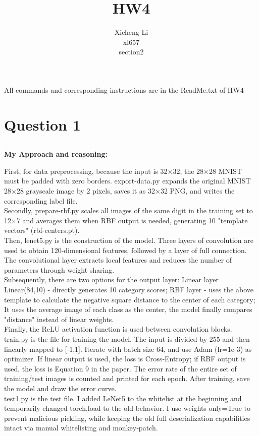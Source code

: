 \documentclass{article}
\title{HW4}
\author{Xicheng Li\\xl657\\section2}
\begin{document}
\maketitle

All commands and corresponding instructions are in the ReadMe.txt of HW4

\section{Question 1}

\subsection{}

\textbf{My Approach and reasoning:}

First, for data preprocessing, because the input is 32×32, the 28×28 MNIST must be padded with zero borders. export-data.py expands the original MNIST 28×28 grayscale image by 2 pixels, saves it as 32×32 PNG, and writes the corresponding label file.
\\
Secondly, prepare-rbf.py scales all images of the same digit in the training set to 12×7 and averages them when RBF output is needed, generating 10 "template vectors" (rbf-centers.pt).
\\
Then, lenet5.py is the construction of the model. Three layers of convolution are used to obtain 120-dimensional features, followed by a layer of full connection. The convolutional layer extracts local features and reduces the number of parameters through weight sharing.
\\
Subsequently, there are two options for the output layer:
Linear layer Linear(84,10) - directly generates 10 category scores;
RBF layer - uses the above template to calculate the negative square distance to the center of each category; It uses the average image of each class as the center, the model finally compares "distance" instead of linear weights.
\\
Finally, the ReLU activation function is used between convolution blocks.
\\
train.py is the file for training the model. The input is divided by 255 and then linearly mapped to [-1,1]. Iterate with batch size 64, and use Adam (lr=1e-3) as optimizer.
If linear output is used, the loss is Cross‑Entropy; if RBF output is used, the loss is Equation 9 in the paper. The error rate of the entire set of training/test images is counted and printed for each epoch. After training, save the model and draw the error curve.
\\
test1.py is the test file. I added LeNet5 to the whitelist at the beginning and temporarily changed torch.load to the old behavior. I use weights-only=True to prevent malicious pickling, while keeping the old full deserialization capabilities intact via manual whitelisting and monkey‑patch.
\end{document}
